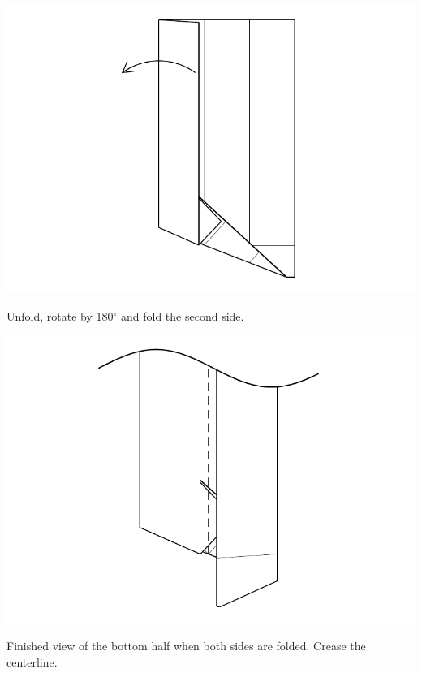 \documentclass[11pt]{article}
\begin{document}
\begin{minipage}[t]{0.3\textwidth}
  \includegraphics[width=\textwidth]{../figs/fig08-07}
  \begin{itemize}{\item[7.] Unfold, rotate by 180$^\circ$ and fold the second side.}\end{itemize}
\end{minipage}
\begin{minipage}[t]{0.3\textwidth}
  \includegraphics[width=\textwidth]{../figs/fig08-08}
  \begin{itemize}{\item[8.] Finished view of the bottom half when both sides are folded.  Crease the centerline.}\end{itemize}
\end{minipage}
\end{document}
